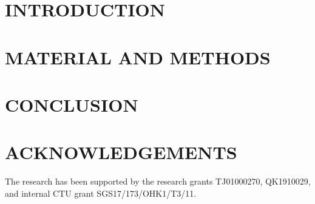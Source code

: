 \documentclass{isprs} %
\begin{document}

\maketitle


\section{INTRODUCTION}\label{INTRODUCTION}
 
\sloppy



\section{MATERIAL AND METHODS}\label{sec:mat_met}





\newpage



\section{CONCLUSION}



\section*{ACKNOWLEDGEMENTS}\label{ACKNOWLEDGEMENTS}
The research has been supported by the research grants TJ01000270,
QK1910029, and internal CTU grant SGS17/173/OHK1/T3/11.

{
  \begin{spacing}{1.17}
    \normalsize
  \end{spacing}
}

\end{document}

